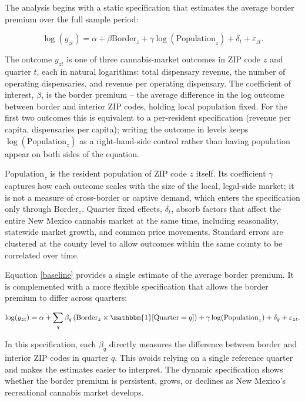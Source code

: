 \documentclass[english,12pt]{article}
\begin{document}
The analysis begins with a static specification that estimates the average border premium over the full sample period:

\begin{equation}
\label{baseline}
\log(y_{zt})=\alpha
+
\beta \text{Border}_z
+
\gamma \log(\text{Population}_z)
+
\delta_t
+
\varepsilon_{zt}.
\end{equation}

The outcome \(y_{zt}\) is one of three cannabis-market outcomes in ZIP code \(z\) and quarter \(t\), each in natural logarithms: total dispensary revenue, the number of operating dispensaries, and revenue per operating dispensary. The coefficient of interest, \(\beta\), is the border premium -- the average difference in the log outcome between border and interior ZIP codes, holding local population fixed. For the first two outcomes this is equivalent to a per-resident specification (revenue per capita, dispensaries per capita); writing the outcome in levels keeps \(\log(\text{Population}_z)\) as a right-hand-side control rather than having population appear on both sides of the equation.

\(\text{Population}_z\) is the resident population of ZIP code \(z\) itself. Its coefficient \(\gamma\) captures how each outcome scales with the size of the local, legal-side market; it is not a measure of cross-border or captive demand, which enters the specification only through \(\text{Border}_z\). Quarter fixed effects, \(\delta_t\), absorb factors that affect the entire New Mexico cannabis market at the same time, including seasonality, statewide market growth, and common price movements. Standard errors are clustered at the county level to allow outcomes within the same county to be correlated over time.

Equation \ref{baseline} provides a single estimate of the average border premium. It is complemented with a more flexible specification that allows the border premium to differ across quarters:

\begin{equation}
\label{baseline_dynamic}
\log(y_{zt})=
\alpha
+
\sum_q
\beta_q
\left(
\text{Border}_z
\times
\mathbbm{1}[\text{Quarter}=q]
\right)
+
\gamma \log(\text{Population}_z)
+
\delta_q
+
\varepsilon_{zt}.
\end{equation}

In this specification, each \(\beta_q\) directly measures the difference between border and interior ZIP codes in quarter \(q\). This avoids relying on a single reference quarter and makes the estimates easier to interpret. The dynamic specification shows whether the border premium is persistent, grows, or declines as New Mexico's recreational cannabis market develops.
\end{document}
